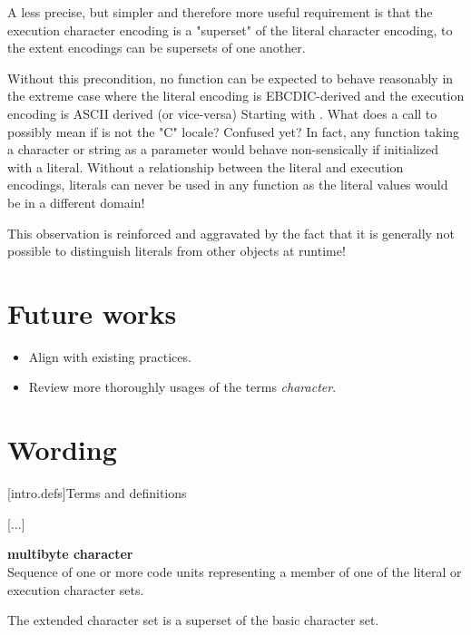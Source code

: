 \documentclass{wg21}
\begin{document}
A less precise, but simpler and therefore more useful requirement is that the execution character encoding is a "superset" of the literal character encoding, to the extent encodings can be supersets of one another.

Without this precondition, no function can be expected to behave reasonably in the extreme case where the literal encoding is EBCDIC-derived and the execution encoding is ASCII derived (or vice-versa)
Starting with . What does a call to  possibly mean if  is not the "C" locale?
Confused yet?
In fact, any function taking a character or string as a parameter would behave non-sensically if initialized with a literal.
Without a relationship between the literal and execution encodings, literals can never be used in any function as the literal values would be in a different domain!

This observation is reinforced and aggravated by the fact that it is generally not possible to distinguish literals from other objects at runtime!


\section{Future works}

\begin{itemize}
\item Align  with existing practices.
\item Review more thoroughly usages of the terms \emph{character}.
\end{itemize}

\section{Wording}



[intro.defs]{Terms and definitions}

[...]

\textbf{multibyte character}\\
{Sequence of one or more code units representing a member of one of the literal or execution character sets.}

\begin{removedblock}
\begin{note}
    The extended character set is a superset of the basic character
    set.
\end{note}
\end{removedblock}
\end{document}
